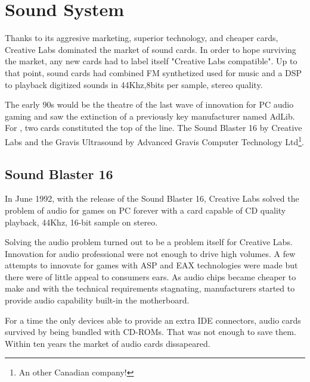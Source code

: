 \section{Sound System}
Thanks to its aggresive marketing, superior technology, and cheaper cards, Creative Labs dominated the market of sound cards. In order to hope surviving the market, any new cards had to label itself "Creative Labs compatible". Up to that point, sound cards had combined FM synthetized used for music and a DSP to playback digitized sounds in 44Khz,8bits per sample, stereo quality.\\
\par
 The early 90s would be the theatre of the last wave of innovation for PC audio gaming and saw the extinction of a previously key manufacturer named AdLib. For \doom, two cards constituted the top of the line. The Sound Blaster 16 by Creative Labs and the Gravis Ultrasound by Advanced Gravis Computer Technology Ltd\footnote{An other Canadian company!}.\\
\par
\subsection{Sound Blaster 16}
 In June 1992, with the release of the Sound Blaster 16, Creative Labs solved the problem of audio for games on PC forever with a card capable of CD quality playback, 44Khz, 16-bit sample on stereo.\\
\par
{}
\par
Solving the audio problem turned out to be a problem itself for Creative Labs. Innovation for audio professional were not enough to drive high volumes. A few attempts to innovate for games with ASP and EAX technologies were made but there were of little appeal to consumers ears. As audio chips became cheaper to make and with the technical requirements stagnating, manufacturers started to provide audio capability built-in the motherboard.\\
\par
For a time the only devices able to provide an extra IDE connectors, audio cards survived by being bundled with CD-ROMs. That was not enough to save them. Within ten years the market of audio cards dissapeared.\\
\par
{}
\par









